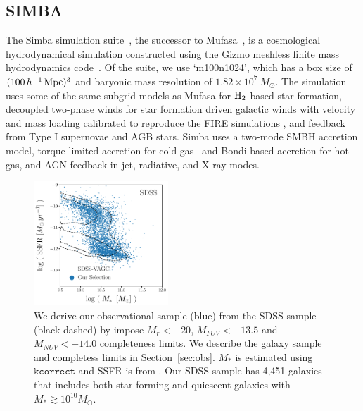 \subsection{SIMBA} \label{sec:simba}
The {\sc Simba} simulation suite~\citep{dave2019}, the successor to {\sc
Mufasa}~\citep{dave2016, dave2017, dave2017a}, is a cosmological hydrodynamical
simulation constructed using the {\sc Gizmo} meshless finite mass hydrodynamics 
code~\citep{hopkins2015, hopkins2017}. Of the suite, we use
`m100n1024', which has a box size of $(100\,h^{-1}\,{\rm Mpc})^3$ and baryonic 
mass resolution of $1.82 \times 10^7\ M_\odot$. The simulation uses some of the same
subgrid models as {\sc Mufasa} for $\rm H_2$ based star formation, decoupled
two-phase winds for star formation driven galactic winds with velocity and mass loading 
calibrated to reproduce the FIRE simulations \citep{muratov2015, angles-alcazar2017b}, and feedback from 
Type I supernovae and AGB stars. {\sc Simba} uses a two-mode SMBH accretion 
model, torque-limited accretion for cold gas~\citep{angles-alcazar2017} and 
Bondi-based accretion for hot gas, and AGN feedback in jet, radiative, and
X-ray modes. %

\begin{figure}
\begin{center}
    \includegraphics[width=0.45\textwidth]{figs/sdss_selection.pdf} 
    \caption{\label{fig:sdss_sel}
    We derive our observational sample (blue) from the \cite{tinker2011}
    SDSS sample (black dashed) by impose $M_r < -20$, $M_{FUV}
    < -13.5$  and $M_{NUV} < -14.0$ completeness limits. 
    We describe the galaxy sample and completess limits in Section~\ref{sec:obs}. 
    $M_*$ is estimated using $\mathtt{kcorrect}$ and SSFR is from
    \cite{brinchmann2004}.
    Our SDSS sample has 4,451 galaxies that includes both
    star-forming and quiescent galaxies with $M_* \gtrsim 10^{10}M_\odot$.
    }
\end{center}
\end{figure}


